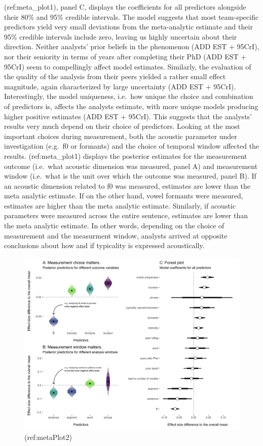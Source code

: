 \documentclass[Review,times,sageh]{sagej}
\begin{document}
(ref:meta\_plot1), panel C, displays the coefficients for all predictors alongside their 80\% and 95\% credible intervals.
The model suggests that most team-specific predictors yield very small deviations from the meta-analytic estimate and their 95\% credible intervals include zero, leaving us highly uncertain about their direction.
Neither analysts' prior beliefs in the phenomenon (ADD EST + 95CrI), nor their seniority in terms of years after completing their PhD (ADD EST + 95CrI) seem to compellingly affect model estimates.
Similarly, the evaluation of the quality of the analysis from their peers yielded a rather small effect magnitude, again characterized by large uncertainty (ADD EST + 95CrI).
Interestingly, the model uniqueness, i.e.~how unique the choice and combination of predictors is, affects the analysts estimate, with more unique models producing higher positive estimates (ADD EST + 95CrI).
This suggests that the analysts' results very much depend on their choice of predictors.
Looking at the most important choices during measurement, both the acoustic parameter under investigation (e.g.~f0 or formants) and the choice of temporal window affected the results.
(ref:meta\_plot1) displays the posterior estimates for the measurement outcome (i.e.~what acoustic dimension was measured, panel A) and measurement window (i.e.~what is the unit over which the outcome was measured, panel B).
If an acoustic dimension related to f0 was measured, estimates are lower than the meta analytic estimate.
If on the other hand, vowel formants were measured, estimates are higher than the meta analytic estimate.
Similarly, if acoustic parameters were measured across the entire sentence, estimates are lower than the meta analytic estimate.
In other words, depending on the choice of measurement and the measurment window, analysts arrived at opposite conclusions about how and if typicality is expressed acoustically.

\begin{figure}
\includegraphics[width=1\linewidth]{../figs/alltogether} \caption{(ref:metaPlot2)}\label{fig:plot-meta2}
\end{figure}
\end{document}

